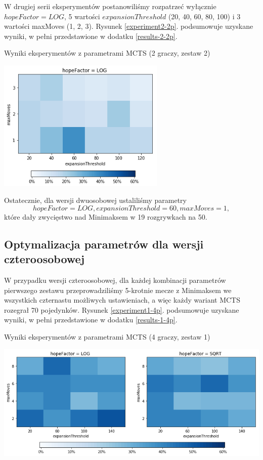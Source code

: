 \documentclass{pracamgr}
\begin{document}
W drugiej serii eksperymentów postanowiliśmy rozpatrzeć wyłącznie \(hopeFactor = LOG\), 5 wartości \(expansionThreshold\) (20, 40, 60, 80, 100) i 3 wartości maxMoves (1, 2, 3).
Rysunek \ref{experiment2-2p}. podsumowuje uzyskane wyniki, w pełni przedstawione w dodatku \ref{results-2-2p}.

\begin{rysunek}
\caption{Wyniki eksperymentów z parametrami MCTS (2 graczy, zestaw 2) \label{experiment2-2p}}
\centering
\includegraphics[width=80mm]{experiment2-2p.png}
\end{rysunek}

Ostatecznie, dla wersji dwuosobowej ustaliliśmy parametry \[hopeFactor = LOG, expansionThreshold = 60, maxMoves=1,\] które dały zwycięstwo nad Minimaksem w 19 rozgrywkach na 50.

\subsection{Optymalizacja parametrów dla wersji czteroosobowej}

W przypadku wersji czteroosobowej, dla każdej kombinacji parametrów pierwszego zestawu przeprowadziliśmy 5-krotnie mecze z Minimaksem we wszystkich czternastu możliwych ustawieniach, a więc każdy wariant MCTS rozegrał 70 pojedynków.
Rysunek \ref{experiment1-4p}. podsumowuje uzyskane wyniki, w pełni przedstawione w dodatku \ref{results-1-4p}.

\begin{rysunek}
\caption{Wyniki eksperymentów z parametrami MCTS (4 graczy, zestaw 1) \label{experiment1-4p}}
\centering
\includegraphics[width=160mm]{experiment1-4p.png}
\end{rysunek}
\end{document}
